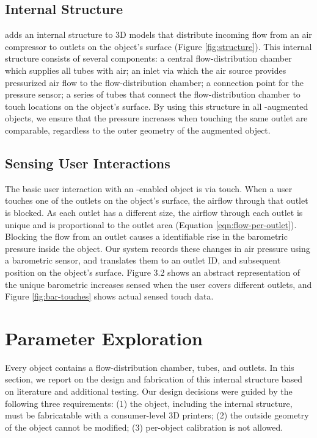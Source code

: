 			\subsection{Internal Structure}
				\at adds an internal structure to 3D models that distribute incoming flow
				from an air compressor to outlets on the object's surface
				(Figure \ref{fig:structure}). This internal structure consists of several
				components: a central flow-distribution chamber which supplies all tubes
				with air; an inlet via which the air source provides pressurized air flow
				to the flow-distribution chamber; a connection point for the pressure
				sensor; a series of tubes that connect the flow-distribution chamber to
				touch locations on the object's surface. By using this structure in all
				\at-augmented objects, we ensure that the pressure increases when touching
				the same outlet are comparable, regardless to the outer geometry of the
				augmented object.

			\subsection{Sensing User Interactions}
				The basic user interaction with an \at-enabled object is via touch. When a
				user touches one of the outlets on the object's surface, the airflow
				through that outlet is blocked. As each outlet has a different size, the
				airflow through each outlet is unique and is proportional to the outlet
				area (Equation \ref{eqn:flow-per-outlet}). Blocking the flow from an outlet causes
				a identifiable rise in the barometric pressure inside the object. Our
				system records these changes in air pressure using a barometric sensor,
				and translates them to an outlet ID, and subsequent position on the
				object's surface. Figure 3.2 shows an abstract representation of the
				unique barometric increases sensed when the user covers different
				outlets, and Figure \ref{fig:bar-touches} shows actual sensed touch
				data.

    \section{Parameter Exploration}
			Every \at object contains a flow-distribution chamber, tubes, and outlets.
			In this section, we report on the design and fabrication of this internal
			structure based on literature and additional testing. Our design decisions
			were guided by the following three requirements: (1) the object, including
			the internal structure, must be fabricatable with a consumer-level 3D
			printers; (2) the outside geometry of the object cannot be modified; (3)
			per-object calibration is not allowed.


